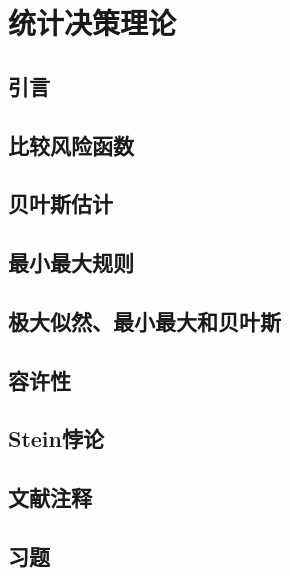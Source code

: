 \chapter{统计决策理论}

\section{引言}

\pending

\section{比较风险函数}

\pending

\section{贝叶斯估计}

\pending

\section{最小最大规则}

\pending

\section{极大似然、最小最大和贝叶斯}

\pending

\section{容许性}

\pending

\section{Stein悖论}

\pending

\section{文献注释}

\pending

\section{习题}

\pending
